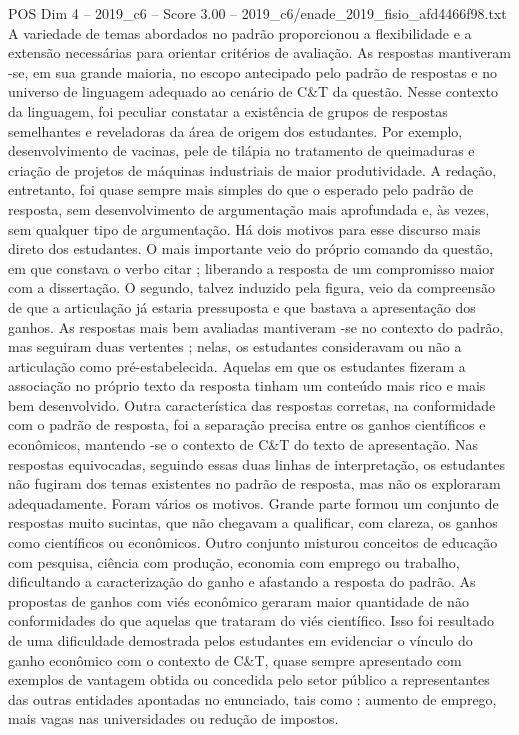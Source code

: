 \begin{textsample}{POS Dim 4 – 2019\_c6 – Score 3.00 – 2019\_c6/enade\_2019\_fisio\_afd4466f98.txt}
A variedade de temas abordados no padrão proporcionou a flexibilidade e a extensão necessárias para orientar critérios de avaliação.
As respostas mantiveram -se, em sua grande maioria, no escopo antecipado pelo padrão de respostas e no universo de linguagem adequado ao cenário de C\&T da questão.
Nesse contexto da linguagem, foi peculiar constatar a existência de grupos de respostas semelhantes e reveladoras da área de origem dos estudantes.
Por exemplo, desenvolvimento de vacinas, pele de tilápia no tratamento de queimaduras e criação de projetos de máquinas industriais de maior produtividade.
A redação, entretanto, foi quase sempre mais simples do que o esperado pelo padrão de resposta, sem desenvolvimento de argumentação mais aprofundada e, às vezes, sem qualquer tipo de argumentação.
Há dois motivos para esse discurso mais direto dos estudantes.
O mais importante veio do próprio comando da questão, em que constava o verbo citar ; liberando a resposta de um compromisso maior com a dissertação.
O segundo, talvez induzido pela figura, veio da compreensão de que a articulação já estaria pressuposta e que bastava a apresentação dos ganhos.
As respostas mais bem avaliadas mantiveram -se no contexto do padrão, mas seguiram duas vertentes ; nelas, os estudantes consideravam ou não a articulação como pré-estabelecida.
Aquelas em que os estudantes fizeram a associação no próprio texto da resposta tinham um conteúdo mais rico e mais bem desenvolvido.
Outra característica das respostas corretas, na conformidade com o padrão de resposta, foi a separação precisa entre os ganhos científicos e econômicos, mantendo -se o contexto de C\&T do texto de apresentação.
Nas respostas equivocadas, seguindo essas duas linhas de interpretação, os estudantes não fugiram dos temas existentes no padrão de resposta, mas não os exploraram adequadamente.
Foram vários os motivos.
Grande parte formou um conjunto de respostas muito sucintas, que não chegavam a qualificar, com clareza, os ganhos como científicos ou econômicos.
Outro conjunto misturou conceitos de educação com pesquisa, ciência com produção, economia com emprego ou trabalho, dificultando a caracterização do ganho e afastando a resposta do padrão.
As propostas de ganhos com viés econômico geraram maior quantidade de não conformidades do que aquelas que trataram do viés científico.
Isso foi resultado de uma dificuldade demostrada pelos estudantes em evidenciar o vínculo do ganho econômico com o contexto de C\&T, quase sempre apresentado com exemplos de vantagem obtida ou concedida pelo setor público a representantes das outras entidades apontadas no enunciado, tais como : aumento de emprego, mais vagas nas universidades ou redução de impostos.

\end{textsample}
